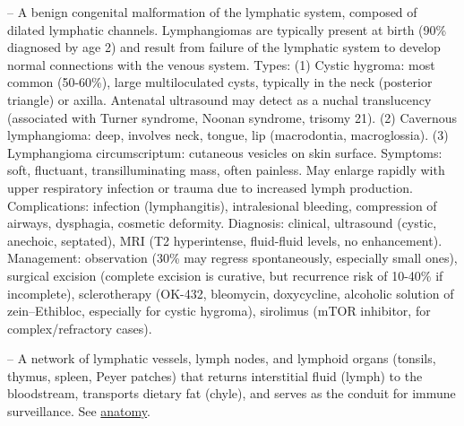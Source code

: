 -- A benign congenital malformation of the lymphatic system, composed of dilated lymphatic channels. Lymphangiomas are typically present at birth (90\% diagnosed by age 2) and result from failure of the lymphatic system to develop normal connections with the venous system. Types: (1) Cystic hygroma: most common (50-60\%), large multiloculated cysts, typically in the neck (posterior triangle) or axilla. Antenatal ultrasound may detect as a nuchal translucency (associated with Turner syndrome, Noonan syndrome, trisomy 21). (2) Cavernous lymphangioma: deep, involves neck, tongue, lip (macrodontia, macroglossia). (3) Lymphangioma circumscriptum: cutaneous vesicles on skin surface. Symptoms: soft, fluctuant, transilluminating mass, often painless. May enlarge rapidly with upper respiratory infection or trauma due to increased lymph production. Complications: infection (lymphangitis), intralesional bleeding, compression of airways, dysphagia, cosmetic deformity. Diagnosis: clinical, ultrasound (cystic, anechoic, septated), MRI (T2 hyperintense, fluid-fluid levels, no enhancement). Management: observation (30\% may regress spontaneously, especially small ones), surgical excision (complete excision is curative, but recurrence risk of 10-40\% if incomplete), sclerotherapy (OK-432, bleomycin, doxycycline, alcoholic solution of zein--Ethibloc, especially for cystic hygroma), sirolimus (mTOR inhibitor, for complex/refractory cases).

-- A network of lymphatic vessels, lymph nodes, and lymphoid organs (tonsils, thymus, spleen, Peyer patches) that returns interstitial fluid (lymph) to the bloodstream, transports dietary fat (chyle), and serves as the conduit for immune surveillance. See \hyperlink{Anatomy}{anatomy}.

